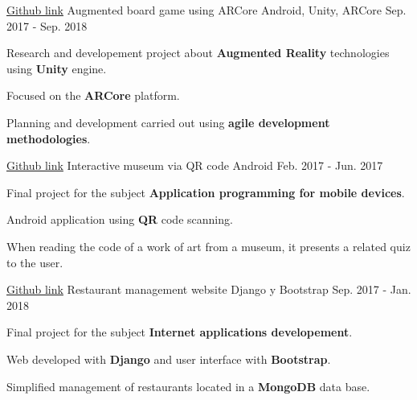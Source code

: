 

\begin{cventries}

  \cventry
    {\href{https://github.com/matl1995/TFG}{Github link}} %
    {Augmented board game using ARCore} %
    {Android, Unity, ARCore} %
    {Sep. 2017 - Sep. 2018} %
    {
      \begin{cvitems} %
        \item {Research and developement project about \textbf{Augmented Reality} technologies using \textbf{Unity} engine.}
        \item {Focused on the \textbf{ARCore} platform.}
        \item {Planning and development carried out using \textbf{agile development methodologies}.}
      \end{cvitems}
    }

  \cventry
    {\href{https://github.com/matl1995/PDM/tree/master/Museo}{Github link}} %
    {Interactive museum via QR code} %
    {Android} %
    {Feb. 2017 - Jun. 2017} %
    {
      \begin{cvitems} %
        \item {Final project for the subject \textbf{Application programming for mobile devices}.}
        \item {Android application using \textbf{QR} code scanning.}
        \item {When reading the code of a work of art from a museum, it presents a related quiz to the user.}
      \end{cvitems}
    }

  \cventry
    {\href{https://github.com/matl1995/DAI}{Github link}} %
    {Restaurant management website} %
    {Django y Bootstrap} %
    {Sep. 2017 - Jan. 2018} %
    {
      \begin{cvitems} %
        \item {Final project for the subject \textbf{Internet applications developement}.}
        \item {Web developed with \textbf{Django} and user interface with \textbf{Bootstrap}.}
        \item {Simplified management of restaurants located in a \textbf{MongoDB} data base.}
      \end{cvitems}
    }


\end{cventries}
